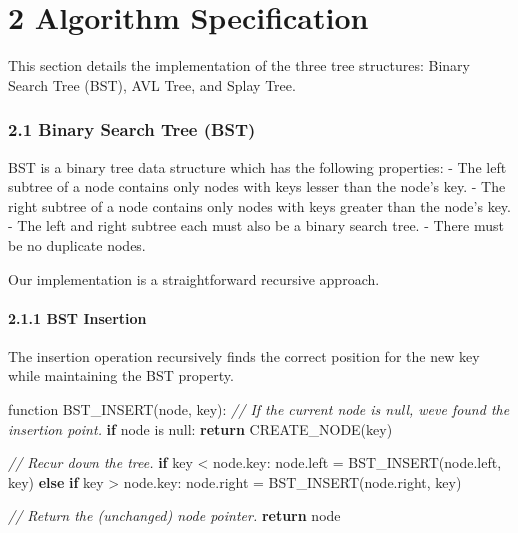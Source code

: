 \documentclass[
]{article}
\newenvironment{Shaded}{}{}
\newcommand{\CommentTok}[1]{\textcolor[rgb]{0.38,0.63,0.69}{\textit{#1}}}
\newcommand{\ControlFlowTok}[1]{\textcolor[rgb]{0.00,0.44,0.13}{\textbf{#1}}}
\newcommand{\NormalTok}[1]{#1}
\begin{document}
\hypertarget{algorithm-specification}{%
\section{2 Algorithm Specification}\label{algorithm-specification}}

This section details the implementation of the three tree structures:
Binary Search Tree (BST), AVL Tree, and Splay Tree.

\hypertarget{binary-search-tree-bst}{%
\subsubsection{2.1 Binary Search Tree
(BST)}\label{binary-search-tree-bst}}

BST is a binary tree data structure which has the following properties:
- The left subtree of a node contains only nodes with keys lesser than
the node's key. - The right subtree of a node contains only nodes with
keys greater than the node's key. - The left and right subtree each must
also be a binary search tree. - There must be no duplicate nodes.

Our implementation is a straightforward recursive approach.

\hypertarget{bst-insertion}{%
\paragraph{2.1.1 BST Insertion}\label{bst-insertion}}

The insertion operation recursively finds the correct position for the
new key while maintaining the BST property.

\begin{pcode}

\begin{Shaded}
\begin{Highlighting}[]
\NormalTok{function BST\_INSERT(node, key):}
  \CommentTok{// If the current node is null, we\textquotesingle{}ve found the insertion point.}
  \ControlFlowTok{if}\NormalTok{ node is null:}
    \ControlFlowTok{return}\NormalTok{ CREATE\_NODE(key)}
  
  \CommentTok{// Recur down the tree.}
  \ControlFlowTok{if}\NormalTok{ key \textless{} node.key:}
\NormalTok{    node.left = BST\_INSERT(node.left, key)}
  \ControlFlowTok{else} \ControlFlowTok{if}\NormalTok{ key \textgreater{} node.key:}
\NormalTok{    node.right = BST\_INSERT(node.right, key)}
  
  \CommentTok{// Return the (unchanged) node pointer.}
  \ControlFlowTok{return}\NormalTok{ node}
\end{Highlighting}
\end{Shaded}

\end{pcode}
\end{document}
